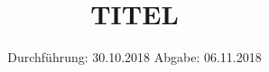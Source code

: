 

\subject{VERSUCH NUMMER}
\title{TITEL}
\date{%
  Durchführung: 30.10.2018
  \hspace{3em}
  Abgabe: 06.11.2018
}



\maketitle
\thispagestyle{empty}
\tableofcontents
\newpage






\printbibliography{}


